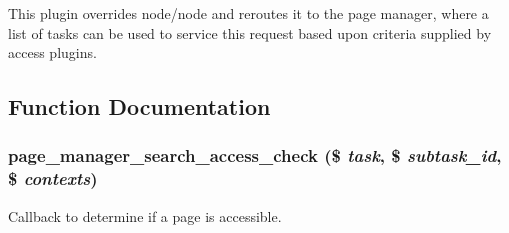 This plugin overrides node/node and reroutes it to the page manager, where a list of tasks can be used to service this request based upon criteria supplied by access plugins. 

\subsection{Function Documentation}
\hypertarget{search_8inc_adde5dbaa1a682f97863333fe038eed4f}{
\subsubsection[{page\_\-manager\_\-search\_\-access\_\-check}]{\setlength{\rightskip}{0pt plus 5cm}page\_\-manager\_\-search\_\-access\_\-check (\$ {\em task}, \/  \$ {\em subtask\_\-id}, \/  \$ {\em contexts})}}
\label{search_8inc_adde5dbaa1a682f97863333fe038eed4f}
Callback to determine if a page is accessible.


